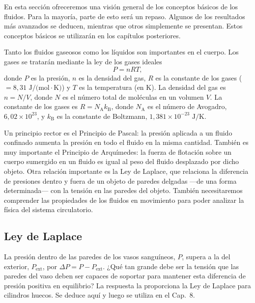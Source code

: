 \documentclass[12pt]{book}
\begin{document}
En esta sección ofreceremos una visión general de los conceptos básicos de los fluidos. Para la mayoría, parte de esto será un repaso. Algunos de los resultados más avanzados se deducen, mientras que otros simplemente se presentan. Estos conceptos básicos se utilizarán en los capítulos posteriores.

Tanto los fluidos gaseosos como los líquidos son importantes en el cuerpo. Los gases se tratarán mediante la ley de los gases ideales
\begin{equation}
P = nRT,
\label{eq:72}
\end{equation}
donde $P$ es la presión, $n$ es la densidad del gas, $R$ es la constante de los gases ($=8{,}31\text{ J/(mol}\cdot\text{K)}$) y $T$ es la temperatura (en $\text{K}$). La densidad del gas es $n = N/V$, donde $N$ es el número total de moléculas en un volumen $V$. La constante de los gases es $R = N_{\text{A}}k_{\text{B}}$, donde $N_{\text{A}}$ es el número de Avogadro, $6{,}02 \times 10^{23}$, y $k_{\text{B}}$ es la constante de Boltzmann, $1{,}381 \times 10^{-23}\text{ J/K}$.

Un principio rector es el Principio de Pascal: la presión aplicada a un fluido confinado aumenta la presión en todo el fluido en la misma cantidad. También es muy importante el Principio de Arquímedes: la fuerza de flotación sobre un cuerpo sumergido en un fluido es igual al peso del fluido desplazado por dicho objeto. Otra relación importante es la Ley de Laplace, que relaciona la diferencia de presiones dentro y fuera de un objeto de paredes delgadas ---de una forma determinada--- con la tensión en las paredes del objeto. También necesitaremos comprender las propiedades de los fluidos en movimiento para poder analizar la física del sistema circulatorio.

\subsection{Ley de Laplace}

La presión dentro de las paredes de los vasos sanguíneos, $P$, supera a la del exterior, $P_{\text{ext}}$, por $\Delta P = P - P_{\text{ext}}$. ¿Qué tan grande debe ser la tensión que las paredes del vaso deben ser capaces de soportar para mantener esta diferencia de presión positiva en equilibrio? La respuesta la proporciona la Ley de Laplace para cilindros huecos. Se deduce aquí y luego se utiliza en el Cap.~8.
\end{document}

